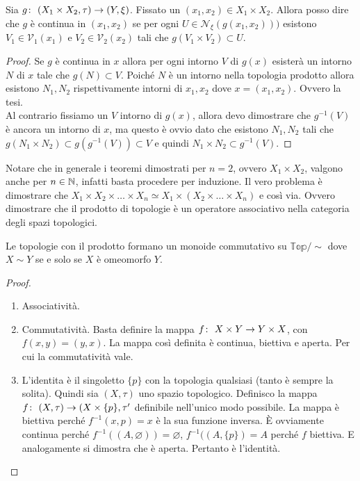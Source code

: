 \begin{theorem}
	Sia $g \colon\ (X_1 \times X_2, \tau) \rightarrow (Y, \xi)$. Fissato un $(x_1, x_2) \in X_1 \times X_2$. Allora posso dire che $g$ è continua in $(x_1, x_2)$ se per ogni $U \in \mathcal{N}_\xi(g(x_1,x_2)))$ esistono $V_1 \in \mathcal{V}_1(x_1)$ e $V_2 \in \mathcal{V}_2(x_2)$ tali che $g(V_1 \times V_2) \subset U$.
\end{theorem}
\begin{proof}
	Se $g$ è continua in $x$ allora per ogni intorno $V$ di $g(x)$ esisterà un intorno $N$ di $x$ tale che $g(N) \subset V$. Poiché $N$ è un intorno nella topologia prodotto allora esistono $N_1, N_2$ rispettivamente intorni di $x_1, x_2$ dove $x = (x_1, x_2)$. Ovvero la tesi.\\
	Al contrario fissiamo un $V$ intorno di $g(x)$, allora devo dimostrare che $g^{-1}(V)$ è ancora un intorno di $x$, ma questo è ovvio dato che esistono $N_1, N_2$ tali che $g(N_1 \times N_2) \subset g(g^{-1}(V)) \subset V$ e quindi $N_1 \times N_2 \subset g^{-1}(V)$. 
\end{proof}

Notare che in generale i teoremi dimostrati per $n=2$, ovvero $X_1 \times X_2$, valgono anche per $n \in \mathbb{N}$, infatti basta procedere per induzione. Il vero problema è dimostrare che $X_1 \times X_2 \times \dots \times X_n \simeq X_1 \times (X_2 \times \dots \times X_n)$ e così via. Ovvero dimostrare che il prodotto di topologie è un operatore associativo nella categoria degli spazi topologici. 

\begin{theorem}
	Le topologie con il prodotto formano un monoide commutativo su $\mathbb{Top}/\sim$ dove $X\sim Y$ se e solo se $X$ è omeomorfo $Y$.
\end{theorem}
\begin{proof}
	\begin{enumerate}
		\item Associatività. 
		\item Commutatività. Basta definire la mappa $f \colon\ X\times Y \rightarrow Y \times X$, con $f(x,y) = (y,x)$. La mappa così definita è continua, biettiva e aperta. Per cui la commutatività vale.
		\item L'identita è il singoletto $\{p\}$ con la topologia qualsiasi (tanto è sempre la solita). Quindi sia $(X, \tau)$ uno spazio topologico. Definisco la mappa $f \colon\ (X, \tau) \rightarrow (X\times \{p\}, \tau'$ definibile nell'unico modo possibile. La mappa è biettiva perché $f^{-1}(x, p) = x$ è la sua funzione inversa. È ovviamente continua perché $f^{-1}((A, \varnothing)) = \varnothing$, $f^{-1}((A, \{p\})= A$ perché $f$ biettiva. E analogamente si dimostra che è aperta. Pertanto è l'identità. 
	\end{enumerate}
\end{proof}

